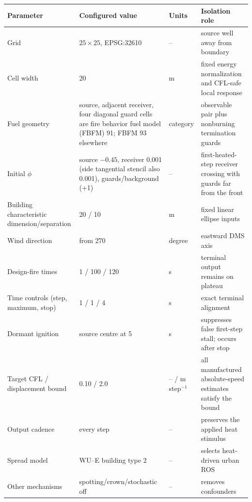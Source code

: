 \begin{center}

\begin{longtable}{@{}P{0.17\textwidth}P{0.29\textwidth}P{0.10\textwidth}P{0.31\textwidth}@{}}\toprule
Parameter & Configured value & Units & Isolation role\\\midrule
Grid & \(25\times25\), EPSG:32610 & -- & source well away from boundary\\
Cell width & 20 & m & fixed energy normalization and CFL-safe local response\\
Fuel geometry & source, adjacent receiver, four diagonal guard cells are fire behavior fuel model (FBFM) 91; FBFM 93 elsewhere & category & observable pair plus nonburning termination guards\\
Initial \(\phi\) & source \(-0.45\), receiver 0.001 (side tangential stencil also 0.001), guards/background (+1) & -- & first-heated-step receiver crossing with guards far from the front\\
Building characteristic dimension/separation & 20 / 10 & m & fixed linear ellipse inputs\\
Wind direction & from 270 & degree & eastward DMS axis\\
Design-fire times & 1 / 100 / 120 & s & terminal output remains on plateau\\
Time controls (step, maximum, stop) & 1 / 1 / 4 & s & exact terminal alignment\\
Dormant ignition & source centre at 5 & s & suppresses false first-step stall; occurs after stop\\
Target CFL / displacement bound & 0.10 / 2.0 & -- / m step\(^{-1}\) & all manufactured absolute-speed estimates satisfy the bound\\
Output cadence & every step & -- & preserves the applied heat stimulus\\
Spread model & WU--E building type 2 & -- & selects heat-driven urban ROS\\
Other mechanisms & spotting/crown/stochastic off & -- & removes confounders\\
\bottomrule\end{longtable}
\end{center}

